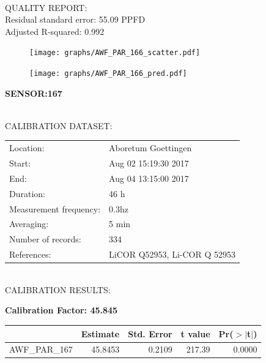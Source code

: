 \documentclass[oneside]{report}
\begin{document}
\hrulefill\\
QUALITY REPORT:\\
Residual standard error: 55.09 PPFD\\
Adjusted R-squared: 0.992



\begin{figure}[H]
  \centering
  \texttt{[image: graphs/AWF\_PAR\_166\_scatter.pdf]}
\end{figure}




\begin{figure}[H]
  \centering
  \texttt{[image: graphs/AWF\_PAR\_166\_pred.pdf]}
\end{figure}

\pagebreak


\begin{center}
\large{\textbf{SENSOR:167}}\\
\end{center}

\hrulefill\\
CALIBRATION DATASET:\\
\begin{table}[h!]
  \centering
  \label{tab:table1}
  \begin{tabular}{ll}
    Location: & Aboretum Goettingen\\ 
    
    
    Start:  & Aug 02 15:19:30 2017 \\
    End:   & Aug 04 13:15:00 2017\\ 
    Duration: & 46 h\\
    Measurement frequency: & 0.3hz\\
    Averaging:  &5 min\\
    Number of records: & 334 \\
    References: & LiCOR Q52953, Li-COR Q 52953 \\
  \end{tabular}
\end{table}

\hrulefill\\
CALIBRATION RESULTS:\\


\begin{center}
\textbf{\large{Calibration Factor: 45.845}}\\
\end{center}
\begin{table}[ht]
\centering
\begin{tabular}{rrrrr}
  \hline
 & Estimate & Std. Error & t value & Pr($>$$|$t$|$) \\ 
  \hline
AWF\_PAR\_167 & 45.8453 & 0.2109 & 217.39 & 0.0000 \\ 
   \hline
\end{tabular}
\end{table}
\end{document}
